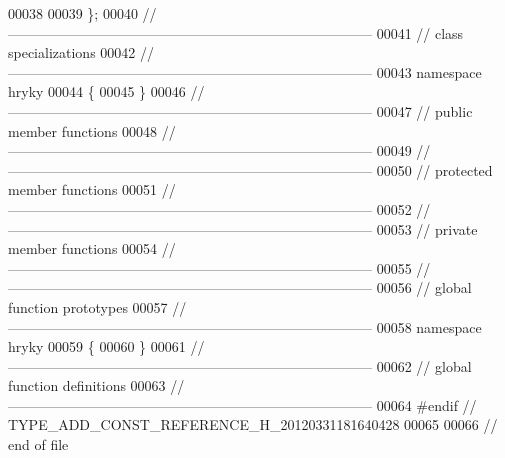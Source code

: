 \begin{DoxyCode}
00038 
00039 \};
00040 \textcolor{comment}{//
      ------------------------------------------------------------------------------}
00041 \textcolor{comment}{// class specializations}
00042 \textcolor{comment}{//
      ------------------------------------------------------------------------------}
00043 \textcolor{keyword}{namespace }hryky
00044 \{
00045 \}
00046 \textcolor{comment}{//
      ------------------------------------------------------------------------------}
00047 \textcolor{comment}{// public member functions}
00048 \textcolor{comment}{//
      ------------------------------------------------------------------------------}
00049 \textcolor{comment}{//
      ------------------------------------------------------------------------------}
00050 \textcolor{comment}{// protected member functions}
00051 \textcolor{comment}{//
      ------------------------------------------------------------------------------}
00052 \textcolor{comment}{//
      ------------------------------------------------------------------------------}
00053 \textcolor{comment}{// private member functions}
00054 \textcolor{comment}{//
      ------------------------------------------------------------------------------}
00055 \textcolor{comment}{//
      ------------------------------------------------------------------------------}
00056 \textcolor{comment}{// global function prototypes}
00057 \textcolor{comment}{//
      ------------------------------------------------------------------------------}
00058 \textcolor{keyword}{namespace }hryky
00059 \{
00060 \}
00061 \textcolor{comment}{//
      ------------------------------------------------------------------------------}
00062 \textcolor{comment}{// global function definitions}
00063 \textcolor{comment}{//
      ------------------------------------------------------------------------------}
00064 \textcolor{preprocessor}{#endif // TYPE\_ADD\_CONST\_REFERENCE\_H\_20120331181640428}
00065 \textcolor{preprocessor}{}
00066 \textcolor{comment}{// end of file}
\end{DoxyCode}
